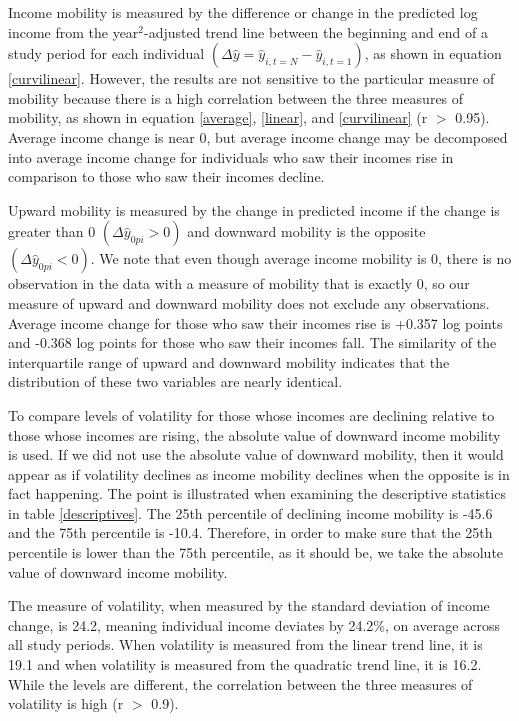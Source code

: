 \documentclass[12pt]{article}
\begin{document}
Income mobility is measured by the difference or change in the predicted log income from the year$^2$-adjusted trend line between the beginning and end of a study period for each individual $(\Delta \hat{y} = \hat{y}_{i,t=N} - \hat{y}_{i,t=1})$, as shown in equation \ref{curvilinear}. However, the results are not sensitive to the particular measure of mobility because there is a high correlation between the three measures of mobility, as shown in equation \ref{average}, \ref{linear}, and \ref{curvilinear} (r $>$ 0.95). Average income change is near 0, but average income change may be decomposed into average income change for individuals who saw their incomes rise in comparison to those who saw their incomes decline.

Upward mobility is measured by the change in predicted income if the change is greater than 0 $(\Delta \hat{y}_{0pi}>0)$ and downward mobility is the opposite $(\Delta \hat{y}_{0pi}<0)$. We note that even though average income mobility is 0, there is no observation in the data with a measure of mobility that is exactly 0, so our measure of upward and downward mobility does not exclude any observations. Average income change for those who saw their incomes rise is +0.357 log points and -0.368 log points for those who saw their incomes fall. The similarity of the interquartile range of upward and downward mobility indicates that the distribution of these two variables are nearly identical.

To compare levels of volatility for those whose incomes are declining relative to those whose incomes are rising, the absolute value of downward income mobility is used. If we did not use the absolute value of downward mobility, then it would appear as if volatility declines as income mobility declines when the opposite is in fact happening. The point is illustrated when examining the descriptive statistics in table \ref{descriptives}. The 25th percentile of declining income mobility is -45.6 and the 75th percentile is -10.4. Therefore, in order to make sure that the 25th percentile is lower than the 75th percentile, as it should be, we take the absolute value of downward income mobility.

The measure of volatility, when measured by the standard deviation of income change, is 24.2, meaning individual income deviates by 24.2\%, on average across all study periods. When volatility is measured from the linear trend line, it is 19.1 and when volatility is measured from the quadratic trend line, it is 16.2. While the levels are different, the correlation between the three measures of volatility is high (r $>$ 0.9).
\end{document}
